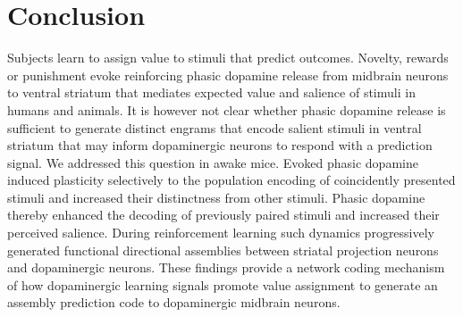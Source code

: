\chapter{Conclusion}
\label{chap:Conclusion}
Subjects learn to assign value to stimuli that predict outcomes. Novelty, rewards or punishment evoke reinforcing phasic dopamine release from midbrain neurons to ventral striatum that mediates expected value and salience of stimuli in humans and animals. It is however not clear whether phasic dopamine release is sufficient to generate distinct engrams that encode salient stimuli in ventral striatum that may inform dopaminergic neurons to respond with a prediction signal. We addressed this question in awake mice. Evoked phasic dopamine induced plasticity selectively to the population encoding of coincidently presented stimuli and increased their distinctness from other stimuli. Phasic dopamine thereby enhanced the decoding of previously paired stimuli and increased their perceived salience. 
During reinforcement learning such dynamics progressively generated functional directional assemblies between striatal projection neurons and dopaminergic neurons. These findings provide a network coding mechanism of how dopaminergic learning signals promote value assignment to generate an assembly prediction code to dopaminergic midbrain neurons.
